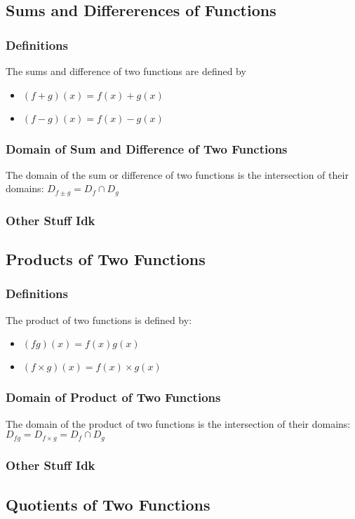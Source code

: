 \documentclass{article}
\begin{document}
	\subsection{Sums and Differerences of Functions}
	\subsubsection{Definitions}
	The sums and difference of two functions are defined by
	\begin{itemize}
		\item $(f+g)(x)=f(x)+g(x)$
		\item $(f-g)(x)=f(x)-g(x)$
	\end{itemize}
	\subsubsection{Domain of Sum and Difference of Two Functions}
	The domain of the sum or difference of two functions is the intersection of their domains: $D_{f\pm g}=D_f\cap D_g$
	\subsubsection{Other Stuff Idk}
	\subsection{Products of Two Functions}
	\subsubsection{Definitions}
	The product of two functions is defined by:
	\begin{itemize}
		\item $(fg)(x)=f(x)g(x)$
		\item $(f\times g)(x)=f(x)\times g(x)$
	\end{itemize}
	\subsubsection{Domain of Product of Two Functions}
	The domain of the product of two functions is the intersection of their domains: $D_{fg}=D_{f\times g}=D_f\cap D_g$
	\subsubsection{Other Stuff Idk}
	\subsection{Quotients of Two Functions}
\end{document}
